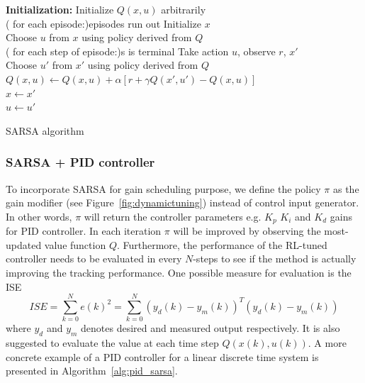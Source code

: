 	\begin{algorithm}[H]
		\textbf{Initialization:} Initialize $ Q(x,u) $ arbitrarily\\
		\Repeat( for each episode:){episodes run out}{
			Initialize $ x $ \\
			Choose $ u $ from $ x $ using policy derived from $ Q $ \\
			\Repeat ( for each step of episode:){s is terminal}{
				Take action $ u $, observe $ r $, $ x' $ \\
				Choose $ u' $ from $ x' $ using policy derived from $ Q $ \\
				$ Q(x,u) \leftarrow Q(x,u) + \alpha[r+\gamma Q(x',u')-Q(x,u)] $	\\
				$ x \leftarrow  x' $\\
				$ u \leftarrow  u' $
			}
		} 		
		\label{alg:sarsa}
		\caption{SARSA algorithm}
	\end{algorithm}
	
	\subsubsection{\ac{SARSA} + \ac{PID} controller}
	To incorporate \ac{SARSA} for gain scheduling purpose, we define the policy $\pi$ as the gain modifier (see Figure~\ref{fig:dynamictuning}) instead of control input generator. In other words, $\pi$ will return the controller parameters e.g. $ K_p $ $ K_i $ and $ K_d $ gains for \ac{PID} controller. In each iteration $\pi$ will be improved by observing the most-updated value function $Q$. Furthermore, the performance of the \ac {RL}-tuned controller needs to be evaluated in every $ N $-steps to see if the method is actually improving the tracking performance. One possible measure for evaluation is the \ac {ISE}
	\begin{equation}
	ISE = \sum_{k=0}^{N}e(k)^2 = \sum_{k=0}^{N}(y_d(k) - y_m(k))^T(y_d(k) - y_m(k))
	\end{equation}
	where $y_d$ and $y_m$ denotes desired and measured output respectively. It is also suggested to evaluate the value at each time step $Q(x(k), u(k))$. A more concrete example of a \ac{PID} controller for a linear discrete time system is presented in Algorithm~\ref{alg:pid_sarsa}.
	
